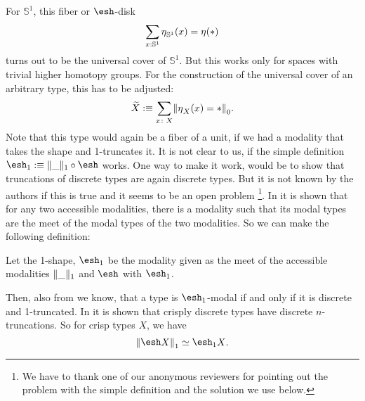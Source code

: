 \documentclass[9pt,twosided]{amsart}
\newcommand{\shape}{\ensuremath{\mathord{\raisebox{0.5pt}{\text{\rm\esh}}}}}
\newcommand{\bS}{\mathbb S}
\begin{document}
For $\bS^{1}$, this fiber or $\shape$-disk
\[ \sum_{x:\bS^{1}}\modalunit_{\bS^{1}}(x)=\modalunit(\ast) \]
turns out to be the universal cover of $\bS^{1}$.
But this works only for spaces with trivial higher homotopy groups. 
For the construction of the universal cover of an arbitrary type, this has to be adjusted:
\[ \widetilde{X}:\equiv \sum_{x\colon X} \trunc{0}{\modalunit_X(x)=\ast}. \]
Note that this type would again be a fiber of a unit, if we had a modality that takes the shape and 1-truncates it.
It is not clear to us, if the simple definition $\shape_1:\equiv\trunc{1}{\_}\circ\shape$ works.
One way to make it work, would be to show that truncations of discrete types are again discrete types.
But it is not known by the authors if this is true and it seems to be an open problem
\footnote{We have to thank one of our anonymous reviewers for pointing out the problem with the simple definition and the solution we use below.}.
In \cite[Theorem 3.28]{RijkeSpittersShulman} it is shown that for any two accessible modalities,
there is a modality such that its modal types are the meet of the modal types of the two modalities.
So we can make the following definition:
\begin{defn}
Let the 1-shape, $\shape_1$ be the modality given as the meet of the accessible modalities $\trunc{1}{\_}$ and $\shape$ with $\shape_1$.
\end{defn}
Then, also from \cite{RijkeSpittersShulman} we know, that a type is $\shape_1$-modal if and only if it is discrete and 1-truncated.
In \cite[Theorem 6.21]{ShulmanRealCohesion} it is shown that crisply discrete types have discrete $n$-truncations.
So for crisp types $X$, we have
\[ \trunc{1}{\shape X} \simeq \shape_1 X\text{.} \]
\end{document}
